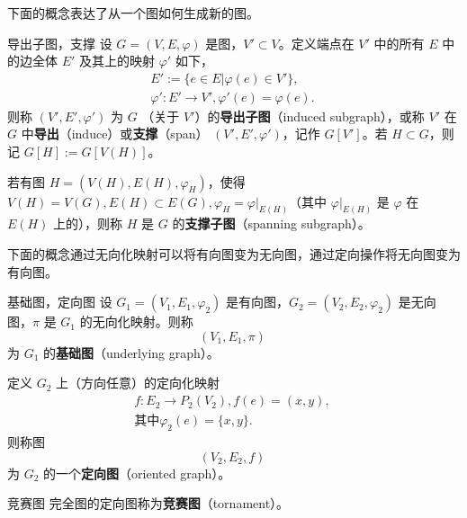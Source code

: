 下面的概念表达了从一个图如何生成新的图。

\begin{definition}{导出子图，支撑}
设 $G=(V,E,\varphi)$ 是图，$V'\subset V$。定义端点在 $V'$ 中的所有 $E$ 中的边全体 $E'$ 及其上的映射 $\varphi'$ 如下，
\begin{equation}
\begin{aligned}
E':=\{e\in E|\varphi(e)\in V'\},\\
\varphi':E'\rightarrow V',\varphi'(e)=\varphi(e).
\end{aligned}~
\end{equation}
则称 $(V',E',\varphi')$ 为 $G$ （关于 $V'$）的\textbf{导出子图}（induced subgraph），或称 $V'$ 在 $G$ 中\textbf{导出}（induce）或\textbf{支撑}（span） $(V',E',\varphi')$，记作 $G[V']$。若 $H\subset G$，则记 $G[H]:=G[V(H)]$。

若有图 $H=(V(H),E(H),\varphi_H)$，使得 $V(H)=V(G),E(H)\subset E(G),\varphi_H=\varphi|_{E(H)}$（其中 $\varphi|_{E(H)}$ 是 $\varphi$ 在 $E(H)$ 上的），则称 $H$ 是 $G$ 的\textbf{支撑子图}（spanning subgraph）。
\end{definition}

下面的概念通过无向化映射可以将有向图变为无向图，通过定向操作将无向图变为有向图。

\begin{definition}{基础图，定向图}
设 $G_1=(V_1,E_1,\varphi_2)$ 是有向图，$G_2=(V_2,E_2,\varphi_2)$ 是无向图，$\pi$ 是 $G_1$ 的无向化映射。则称
\begin{equation}
(V_1,E_1,\pi)~
\end{equation}
为 $G_1$ 的\textbf{基础图}（underlying graph）。

定义 $G_2$ 上（方向任意）的定向化映射
\begin{equation}
\begin{aligned}
f:E_2\rightarrow P_2(V_2),f(e)=(x,y),\\
\text{其中} \varphi_2(e)=\{x,y\}.
\end{aligned}~
\end{equation}
则称图
\begin{equation}
(V_2,E_2,f)~
\end{equation}
为 $G_2$ 的一个\textbf{定向图}（oriented graph）。
\end{definition}

\begin{definition}{竞赛图}
完全图的定向图称为\textbf{竞赛图}（tornament）。
\end{definition}




